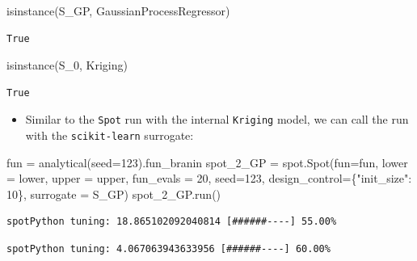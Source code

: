 \documentclass[
  letterpaper,
  DIV=11,
  numbers=noendperiod]{scrreprt}
\newenvironment{Shaded}{\begin{snugshade}}{\end{snugshade}}
\newcommand{\BuiltInTok}[1]{\textcolor[rgb]{0.00,0.23,0.31}{#1}}
\newcommand{\DecValTok}[1]{\textcolor[rgb]{0.68,0.00,0.00}{#1}}
\newcommand{\NormalTok}[1]{\textcolor[rgb]{0.00,0.23,0.31}{#1}}
\newcommand{\OperatorTok}[1]{\textcolor[rgb]{0.37,0.37,0.37}{#1}}
\newcommand{\StringTok}[1]{\textcolor[rgb]{0.13,0.47,0.30}{#1}}
\providecommand{\tightlist}{%
  \setlength{\itemsep}{0pt}\setlength{\parskip}{0pt}}\usepackage{longtable,booktabs,array}
\begin{document}
\begin{Shaded}
\begin{Highlighting}[]
\BuiltInTok{isinstance}\NormalTok{(S\_GP, GaussianProcessRegressor)}
\end{Highlighting}
\end{Shaded}

\begin{verbatim}
True
\end{verbatim}

\begin{Shaded}
\begin{Highlighting}[]
\BuiltInTok{isinstance}\NormalTok{(S\_0, Kriging)}
\end{Highlighting}
\end{Shaded}

\begin{verbatim}
True
\end{verbatim}

\begin{itemize}
\tightlist
\item
  Similar to the \texttt{Spot} run with the internal \texttt{Kriging}
  model, we can call the run with the \texttt{scikit-learn} surrogate:
\end{itemize}

\begin{Shaded}
\begin{Highlighting}[]
\NormalTok{fun }\OperatorTok{=}\NormalTok{ analytical(seed}\OperatorTok{=}\DecValTok{123}\NormalTok{).fun\_branin}
\NormalTok{spot\_2\_GP }\OperatorTok{=}\NormalTok{ spot.Spot(fun}\OperatorTok{=}\NormalTok{fun,}
\NormalTok{                   lower }\OperatorTok{=}\NormalTok{ lower,}
\NormalTok{                   upper }\OperatorTok{=}\NormalTok{ upper,}
\NormalTok{                   fun\_evals }\OperatorTok{=} \DecValTok{20}\NormalTok{,}
\NormalTok{                   seed}\OperatorTok{=}\DecValTok{123}\NormalTok{,}
\NormalTok{                   design\_control}\OperatorTok{=}\NormalTok{\{}\StringTok{"init\_size"}\NormalTok{: }\DecValTok{10}\NormalTok{\},}
\NormalTok{                   surrogate }\OperatorTok{=}\NormalTok{ S\_GP)}
\NormalTok{spot\_2\_GP.run()}
\end{Highlighting}
\end{Shaded}

\begin{verbatim}
spotPython tuning: 18.865102092040814 [######----] 55.00% 
\end{verbatim}

\begin{verbatim}
spotPython tuning: 4.067063943633956 [######----] 60.00% 
\end{verbatim}
\end{document}

